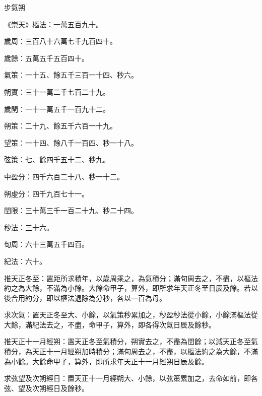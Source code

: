 \begin{pinyinscope}
 步氣朔



 《崇天》樞法：一萬五百九十。



 歲周：三百八十六萬七千九百四十。



 歲餘：五萬五千五百四十。



 氣策：一十五、餘五千三百一十四、秒六。



 朔實：三十一萬二千七百二十九。



 歲閏：一十一萬五千一百九十二。



 朔策：二十九、餘五千六百一十九。



 望策：一十四、餘八千一百四、秒一十八。



 弦策：七、餘四千五十二、秒九。



 中盈分：四千六百二十八、秒一十二。



 朔虛分：四千九百七十一。



 閏限：三十萬三千一百二十九、秒二十四。



 秒法：三十六。



 旬周：六十三萬五千四百。



 紀法：六十。



 推天正冬至：置距所求積年，以歲周乘之，為氣積分；滿旬周去之，不盡，以樞法約之為大餘，不滿為小餘。大餘命甲子，算外，即所求年天正冬至日辰及餘。若以後合用約分，即以樞法退除為分秒，各以一百為母。



 求次氣：置天正冬至大、小餘，以氣策秒累加之，秒盈秒法從小餘，小餘滿樞法從大餘，滿紀法去之，不盡，命甲子，算外，即各得次氣日辰及餘秒。



 推天正十一月經朔：置天正冬至氣積分，朔實去之，不盡為閏餘；以減天正冬至氣積分，為天正十一月經朔加時積分；滿旬周去之，不盡，以樞法約之為大餘，不滿為小餘。大餘命甲子，算外，即所求年天正十一月經朔日辰及餘。



 求弦望及次朔經日：置天正十一月經朔大、小餘，以弦策累加之，去命如前，即各弦、望及次朔經日及餘秒。




\end{pinyinscope}
